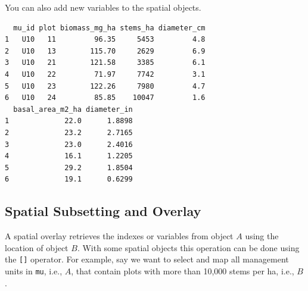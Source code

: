 \documentclass[
]{krantz}
\makeatletter
\newenvironment{Shaded}{\begin{snugshade}}{\end{snugshade}}
\newcommand{\ErrorTok}[1]{\textcolor[rgb]{0.14,0.14,0.14}{\textbf{#1}}}
\newcommand{\FloatTok}[1]{\textcolor[rgb]{0.06,0.06,0.06}{#1}}
\newcommand{\KeywordTok}[1]{\textcolor[rgb]{0.27,0.27,0.27}{\textbf{#1}}}
\newcommand{\NormalTok}[1]{#1}
\newcommand{\OperatorTok}[1]{\textcolor[rgb]{0.43,0.43,0.43}{\textbf{#1}}}
\newcommand{\StringTok}[1]{\textcolor[rgb]{0.5,0.5,0.5}{#1}}
\newenvironment{kframe}{%
\medskip{}
\setlength{\fboxsep}{.8em}
 \def\at@end@of@kframe{}%
 \ifinner\ifhmode%
  \def\at@end@of@kframe{\end{minipage}}%
  \begin{minipage}{\columnwidth}%
 \fi\fi%
 \def\FrameCommand##1{\hskip\@totalleftmargin \hskip-\fboxsep
 \colorbox{shadecolor}{##1}\hskip-\fboxsep
     \hskip-\linewidth \hskip-\@totalleftmargin \hskip\columnwidth}%
 \MakeFramed {\advance\hsize-\width
   \@totalleftmargin\z@ \linewidth\hsize
   \@setminipage}}%
 {\par\unskip\endMakeFramed%
 \at@end@of@kframe}
\renewenvironment{Shaded}{\begin{kframe}}{\end{kframe}}
\makeatother
\begin{document}
You can also add new variables to the spatial objects.

\begin{Shaded}
\end{Shaded}

\begin{verbatim}
  mu_id plot biomass_mg_ha stems_ha diameter_cm
1   U10   11         96.35     5453         4.8
2   U10   13        115.70     2629         6.9
3   U10   21        121.58     3385         6.1
4   U10   22         71.97     7742         3.1
5   U10   23        122.26     7980         4.7
6   U10   24         85.85    10047         1.6
  basal_area_m2_ha diameter_in
1             22.0      1.8898
2             23.2      2.7165
3             23.0      2.4016
4             16.1      1.2205
5             29.2      1.8504
6             19.1      0.6299
\end{verbatim}

\hypertarget{spatial-subsetting-and-overlay}{%
\subsection{Spatial Subsetting and Overlay}\label{spatial-subsetting-and-overlay}}

A spatial overlay retrieves the indexes or variables from object \(A\) using the location of object \(B\). With some spatial objects this operation can be done using the \texttt{{[}{]}} operator. For example, say we want to select and map all management units in \texttt{mu}, i.e., \(A\), that contain plots with more than 10,000 stems per ha, i.e., \(B\).
\end{document}

